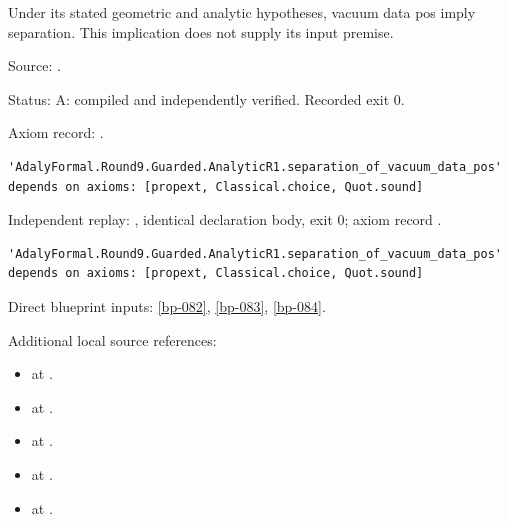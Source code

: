 \begin{theorem}[bp-261]
\label{bp-261}
\leanok
Under its stated geometric and analytic hypotheses, vacuum data pos imply separation. This implication does not supply its input premise.

\par Source: \texttt{}.
\par Status: A: compiled and independently verified. Recorded exit 0.
\par Axiom record: \texttt{}.
\begin{verbatim}
'AdalyFormal.Round9.Guarded.AnalyticR1.separation_of_vacuum_data_pos' depends on axioms: [propext, Classical.choice, Quot.sound]
\end{verbatim}
\par Independent replay: \texttt{}, identical declaration body, exit 0; axiom record \texttt{}.
\begin{verbatim}
'AdalyFormal.Round9.Guarded.AnalyticR1.separation_of_vacuum_data_pos' depends on axioms: [propext, Classical.choice, Quot.sound]
\end{verbatim}
\par Direct blueprint inputs: \ref{bp-082}, \ref{bp-083}, \ref{bp-084}.
\par Additional local source references:
\begin{itemize}
\item \texttt{} at \texttt{}.
\item \texttt{} at \texttt{}.
\item \texttt{} at \texttt{}.
\item \texttt{} at \texttt{}.
\item \texttt{} at \texttt{}.

\end{itemize}
\end{theorem}
